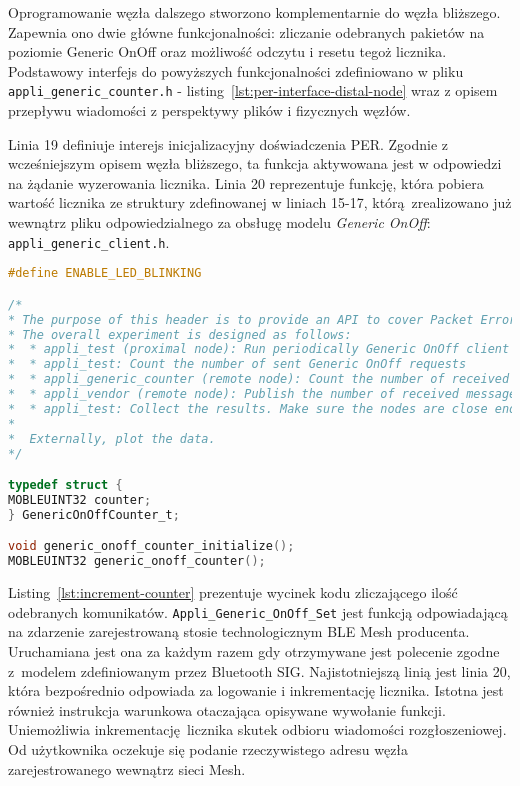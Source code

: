 Oprogramowanie węzła dalszego stworzono komplementarnie do węzła bliższego. Zapewnia ono dwie główne funkcjonalności:
zliczanie odebranych pakietów na poziomie Generic OnOff oraz możliwość odczytu i resetu tegoż licznika. Podstawowy interfejs do 
powyższych funkcjonalności zdefiniowano w pliku \texttt{appli\_generic\_counter.h} - listing~\ref{lst:per-interface-distal-node}
wraz z opisem przepływu wiadomości z perspektywy plików i fizycznych węzłów.

Linia 19 definiuje interejs inicjalizacyjny doświadczenia PER. Zgodnie z wcześniejszym opisem węzła bliższego,
ta funkcja aktywowana jest w odpowiedzi na żądanie wyzerowania licznika. Linia 20 reprezentuje funkcję,
która pobiera wartość licznika ze struktury zdefinowanej w liniach 15-17, którą zrealizowano już wewnątrz
pliku odpowiedzialnego za obsługę modelu \textit{Generic OnOff}: \texttt{appli\_generic\_client.h}.

\begin{lstlisting}[language=C,
    caption={Interfejs eksperymentu PER dla węzła dalszego},
    label={lst:per-interface-distal-node}]
#define ENABLE_LED_BLINKING

/*
* The purpose of this header is to provide an API to cover Packet Error Rate experiment.
* The overall experiment is designed as follows:
*  * appli_test (proximal node): Run periodically Generic OnOff client model (SET-05)
*  * appli_test: Count the number of sent Generic OnOff requests
*  * appli_generic_counter (remote node): Count the number of received messages
*  * appli_vendor (remote node): Publish the number of received messages
*  * appli_test: Collect the results. Make sure the nodes are close enough to get the results
*
*  Externally, plot the data.
*/

typedef struct {
MOBLEUINT32 counter;
} GenericOnOffCounter_t;

void generic_onoff_counter_initialize();
MOBLEUINT32 generic_onoff_counter();
\end{lstlisting}

Listing~\ref{lst:increment-counter} prezentuje wycinek kodu zliczającego ilość odebranych komunikatów. 
\texttt{Appli\_Generic\_OnOff\_Set} jest funkcją odpowiadającą na zdarzenie zarejestrowaną stosie technologicznym
BLE Mesh producenta. Uruchamiana jest ona za każdym razem gdy otrzymywane jest polecenie zgodne
z~modelem zdefiniowanym przez Bluetooth SIG. Najistotniejszą linią jest linia 20, która bezpośrednio
odpowiada za logowanie i inkrementację licznika. Istotna jest również instrukcja warunkowa
otaczająca opisywane wywołanie funkcji. Uniemożliwia inkrementację licznika skutek odbioru
wiadomości rozgłoszeniowej. Od użytkownika oczekuje się podanie rzeczywistego adresu węzła
zarejestrowanego wewnątrz sieci Mesh.

